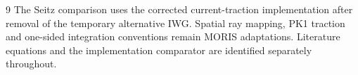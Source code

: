 \documentclass[11pt,a4paper]{article}
\begin{document}
\begin{thebibliography}{9}
The Seitz comparison uses the corrected current-traction implementation after
removal of the temporary alternative IWG. Spatial ray mapping, PK1 traction and
one-sided integration conventions remain MORIS adaptations. Literature equations
and the implementation comparator are identified separately throughout.
\end{thebibliography}
\end{document}
